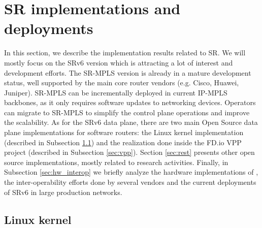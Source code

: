 \section{SR implementations and deployments}
\label{sec:tools}

\begin{comment}

\begin{itemize}
    \item VPP implementation of SR
    \item Other open source implementations from the works listed in Research Directions (if the tools are open source and are valuable)
    \item Other implementations from vendors
\end{itemize}

\end{comment}

In this section, we describe the implementation results related to SR. We will mostly focus on the SRv6 version which is attracting a lot of interest and development efforts. The SR-MPLS version is already in a mature development status, well supported by the main core router vendors (e.g. Cisco, Huawei, Juniper). SR-MPLS can be incrementally deployed in current IP-MPLS backbones, as it only requires software updates to networking devices. Operators can migrate to SR-MPLS to simplify the control plane operations and improve the scalability. As for the SRv6 data plane, there are two main Open Source data plane implementations for software routers: the Linux kernel implementation (described in Subsection \ref{sec:linux}) and the realization done inside the FD.io VPP project (described in Subsection \ref{sec:vpp}).  Section \ref{sec:rest} presents other open source implementations, mostly related to research activities. Finally, in Subsection \ref{sec:hw_interop} we briefly analyze the hardware implementations of , the inter-operability efforts done by several vendors and the current deployments of SRv6 in large production networks.

\subsection{Linux kernel}
\label{sec:linux}

